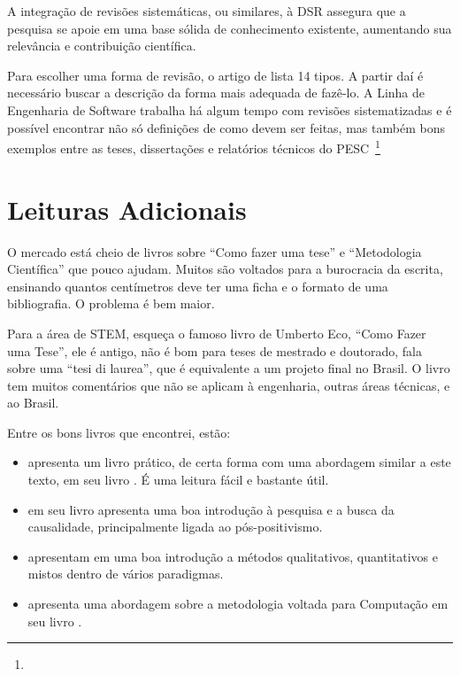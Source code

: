 A integração de revisões sistemáticas, ou similares, à DSR assegura que a pesquisa se apoie em uma base sólida de conhecimento existente, aumentando sua relevância e contribuição científica.

Para escolher uma forma de revisão, o artigo de \citet{grant2009typology} lista 14 tipos. A partir daí é necessário buscar a descrição da forma mais adequada de fazê-lo. A Linha de Engenharia de Software trabalha há algum tempo com revisões sistematizadas e é possível encontrar não só definições de como devem ser feitas, mas também bons exemplos entre as teses, dissertações e relatórios técnicos do PESC~\footnote{}

\section{Leituras Adicionais}


O mercado está cheio de livros sobre ``Como fazer uma tese'' e ``Metodologia Científica'' que pouco ajudam. Muitos são voltados para a burocracia da escrita, ensinando quantos centímetros deve ter uma ficha e o formato de uma bibliografia. O problema é bem maior.

Para a área de STEM, esqueça o famoso livro de Umberto Eco, ``Como Fazer uma Tese'', ele é antigo, não é bom para teses de mestrado e doutorado, fala sobre uma ``tesi di laurea'', que é equivalente a um projeto final no Brasil. O livro tem muitos comentários que não se aplicam à engenharia, outras áreas técnicas, e ao Brasil. 

Entre os bons livros que encontrei, estão:
\begin{itemize}
    \item \citet{freitas2001} apresenta um livro prático, de certa forma com uma abordagem similar a este texto, em seu livro . É uma leitura fácil e bastante útil.
\item \citet{woodwell2014} em seu livro  apresenta uma boa introdução à pesquisa e a busca da causalidade, principalmente ligada ao pós-positivismo.
\item \citet{creswell2021projeto} apresentam em  uma boa introdução a métodos qualitativos, quantitativos e mistos dentro de vários paradigmas.
\item \citet{Wazla2021} apresenta uma abordagem sobre a metodologia voltada para Computação em seu livro .
\end{itemize}

